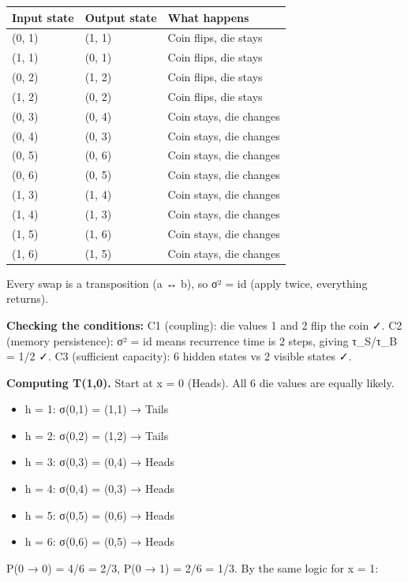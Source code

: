 \documentclass[
]{article}
\providecommand{\tightlist}{%
  \setlength{\itemsep}{0pt}\setlength{\parskip}{0pt}}
\begin{document}
\begin{longtable}[]{@{}lll@{}}
\toprule\noalign{}
Input state & Output state & What happens \\
\midrule\noalign{}
\endhead
\bottomrule\noalign{}
\endlastfoot
(0, 1) & (1, 1) & Coin flips, die stays \\
(1, 1) & (0, 1) & Coin flips, die stays \\
(0, 2) & (1, 2) & Coin flips, die stays \\
(1, 2) & (0, 2) & Coin flips, die stays \\
(0, 3) & (0, 4) & Coin stays, die changes \\
(0, 4) & (0, 3) & Coin stays, die changes \\
(0, 5) & (0, 6) & Coin stays, die changes \\
(0, 6) & (0, 5) & Coin stays, die changes \\
(1, 3) & (1, 4) & Coin stays, die changes \\
(1, 4) & (1, 3) & Coin stays, die changes \\
(1, 5) & (1, 6) & Coin stays, die changes \\
(1, 6) & (1, 5) & Coin stays, die changes \\
\end{longtable}

Every swap is a transposition (a ↔ b), so σ² = id (apply twice,
everything returns).

\textbf{Checking the conditions:} C1 (coupling): die values 1 and 2 flip
the coin ✓. C2 (memory persistence): σ² = id means recurrence time is 2
steps, giving τ\_S/τ\_B = 1/2 ✓. C3 (sufficient capacity): 6 hidden
states vs 2 visible states ✓.

\textbf{Computing T(1,0).} Start at x = 0 (Heads). All 6 die values are
equally likely.

\begin{itemize}
\tightlist
\item
  h = 1: σ(0,1) = (1,1) → Tails
\item
  h = 2: σ(0,2) = (1,2) → Tails
\item
  h = 3: σ(0,3) = (0,4) → Heads
\item
  h = 4: σ(0,4) = (0,3) → Heads
\item
  h = 5: σ(0,5) = (0,6) → Heads
\item
  h = 6: σ(0,6) = (0,5) → Heads
\end{itemize}

P(0 → 0) = 4/6 = 2/3, P(0 → 1) = 2/6 = 1/3. By the same logic for x = 1:
\end{document}

